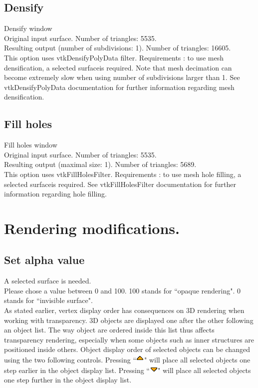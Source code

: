 \subsection{Densify}
Densify window\\
Original input surface. Number of triangles: 5535.\\

Resulting output (number of subdivisions: 1). Number of triangles: 16605.\\


This option uses vtkDensifyPolyData filter.
Requirements : to use mesh densification, a selected
surfaceis required.
Note that mesh decimation can become extremely slow
when using number of subdivisions larger than 1.
See vtkDensifyPolyData documentation for further information regarding mesh densification.

\subsection{Fill holes}
Fill holes window\\
Original input surface. Number of triangles: 5535. \\
Resulting output (maximal size: 1). Number of triangles: 5689.\\


This option uses vtkFillHolesFilter.
Requirements : to use mesh hole filling, a selected surfaceis
required. See vtkFillHolesFilter documentation for further
information regarding hole filling.


\section{Rendering modifications.}
\subsection{Set alpha value}
A selected surface is needed.\\
Please chose a value between 0 and 100. 100 stands for ``opaque
rendering". 0 stands for ``invisible surface".\\
As stated earlier, vertex display order has consequences on 3D rendering when working with
transparency. 3D objects are displayed one after the other following an object list. The way object are ordered inside this list thus affects transparency rendering, especially when some objects such as inner structures are positioned inside others. Object display order of selected objects can be changed using the two following controls. Pressing ``\includegraphics[scale=0.7]{images/pixmap/s_dessous_17.png}" will place all selected objects one step earlier in the object display list. Pressing ``\includegraphics[scale=0.7]{images/pixmap/s_dessus_17.png}" will place all selected objects one step further in the object display
list.\\

